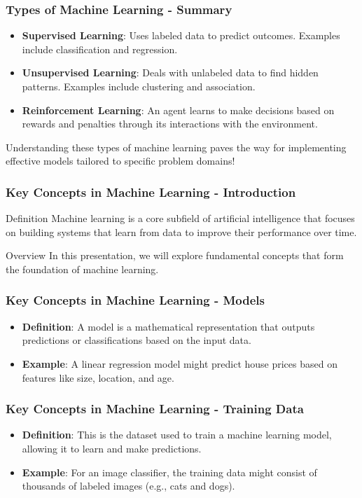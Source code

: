 \documentclass[aspectratio=169]{beamer}
\begin{document}
\begin{frame}[fragile]
    \frametitle{Types of Machine Learning - Summary}
    \begin{itemize}
        \item \textbf{Supervised Learning}: Uses labeled data to predict outcomes. Examples include classification and regression.
        \item \textbf{Unsupervised Learning}: Deals with unlabeled data to find hidden patterns. Examples include clustering and association.
        \item \textbf{Reinforcement Learning}: An agent learns to make decisions based on rewards and penalties through its interactions with the environment.
    \end{itemize}
    
    Understanding these types of machine learning paves the way for implementing effective models tailored to specific problem domains!
\end{frame}

\begin{frame}[fragile]
    \frametitle{Key Concepts in Machine Learning - Introduction}
    \begin{block}{Definition}
        Machine learning is a core subfield of artificial intelligence that focuses on building systems that learn from data to improve their performance over time. 
    \end{block}
    \begin{block}{Overview}
        In this presentation, we will explore fundamental concepts that form the foundation of machine learning.
    \end{block}
\end{frame}

\begin{frame}[fragile]
    \frametitle{Key Concepts in Machine Learning - Models}
    \begin{itemize}
        \item \textbf{Definition}: A model is a mathematical representation that outputs predictions or classifications based on the input data.
        \item \textbf{Example}: A linear regression model might predict house prices based on features like size, location, and age.
    \end{itemize}
\end{frame}

\begin{frame}[fragile]
    \frametitle{Key Concepts in Machine Learning - Training Data}
    \begin{itemize}
        \item \textbf{Definition}: This is the dataset used to train a machine learning model, allowing it to learn and make predictions.
        \item \textbf{Example}: For an image classifier, the training data might consist of thousands of labeled images (e.g., cats and dogs).
    \end{itemize}
\end{frame}
\end{document}
